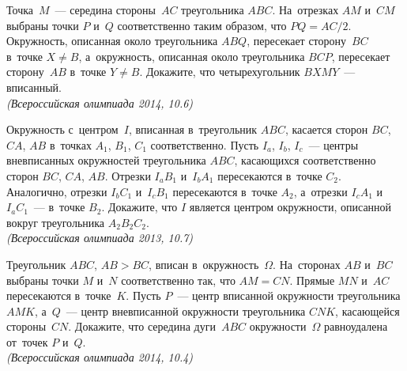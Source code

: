 \begin{problems}
\item
Точка~$M$~— середина стороны~$AC$ треугольника $ABC$.
На~отрезках $AM$ и~$CM$ выбраны точки $P$ и~$Q$ соответственно таким образом,
что $PQ = AC / 2$.
Окружность, описанная около треугольника $ABQ$, пересекает сторону~$BC$
в~точке $X \neq B$, а~окружность, описанная около треугольника $BCP$,
пересекает сторону~$AB$ в~точке $Y \neq B$.
Докажите, что четырехугольник $BXMY$~— вписанный.
\\\emph{(Всероссийская олимпиада 2014, 10.6)}

\item
Окружность с~центром~$I$, вписанная в~треугольник $ABC$, касается сторон
$BC$, $CA$, $AB$ в~точках $A_1$, $B_1$, $C_1$ соответственно.
Пусть $I_a$, $I_b$, $I_c$~— центры вневписанных окружностей треугольника
$ABC$, касающихся соответственно сторон $BC$, $CA$, $AB$.
Отрезки $I_a B_1$ и~$I_b A_1$ пересекаются в~точке $C_2$.
Аналогично, отрезки $I_b C_1$ и~$I_c B_1$ пересекаются в~точке $A_2$, а~отрезки
$I_c A_1$ и~$I_a C_1$~— в~точке $B_2$.
Докажите, что $I$ является центром окружности, описанной вокруг треугольника
$A_2 B_2 C_2$.
\\\emph{(Всероссийская олимпиада 2013, 10.7)}

\item
Треугольник $ABC$, $AB > BC$, вписан в~окружность~$\Omega$.
На~сторонах $AB$ и~$BC$ выбраны точки $M$ и~$N$ соответственно так, что
$AM = CN$.
Прямые $MN$ и~$AC$ пересекаются в~точке~$K$.
Пусть $P$~— центр вписанной окружности треугольника $AMK$, а~$Q$~— центр
вневписанной окружности треугольника $CNK$, касающейся стороны~$CN$.
Докажите, что середина дуги~$ABC$ окружности~$\Omega$ равноудалена
от~точек $P$ и~$Q$.
\\\emph{(Всероссийская олимпиада 2014, 10.4)}

\end{problems}

